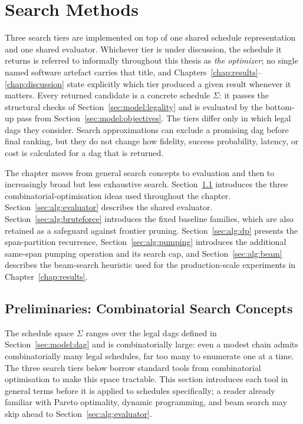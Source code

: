 \chapter{Search Methods}
\label{chap:algorithms}


Three search tiers are implemented on top of one shared schedule representation and one shared evaluator. Whichever tier is under discussion, the schedule it returns is referred to informally throughout this thesis as \emph{the optimizer}; no single named software artefact carries that title, and Chapters~\ref{chap:results}--\ref{chap:discussion} state explicitly which tier produced a given result whenever it matters. Every returned candidate is a concrete schedule $\Sigma$: it passes the structural checks of Section~\ref{sec:model:legality} and is evaluated by the bottom-up pass from Section~\ref{sec:model:objectives}. The tiers differ only in which legal \Glspl{dag} they consider. Search approximations can exclude a promising \Gls{dag} before final ranking, but they do not change how fidelity, success probability, latency, or cost is calculated for a \Gls{dag} that is returned.

The chapter moves from general search concepts to evaluation and then to increasingly broad but less exhaustive search. Section~\ref{sec:alg:prelims} introduces the three combinatorial-optimisation ideas used throughout the chapter. Section~\ref{sec:alg:evaluator} describes the shared evaluator. Section~\ref{sec:alg:bruteforce} introduces the fixed baseline families, which are also retained as a safeguard against frontier pruning. Section~\ref{sec:alg:dp} presents the span-partition recurrence, Section~\ref{sec:alg:pumping} introduces the additional same-span pumping operation and its search cap, and Section~\ref{sec:alg:beam} describes the beam-search heuristic used for the production-scale experiments in Chapter~\ref{chap:results}.

\section{Preliminaries: Combinatorial Search Concepts}
\label{sec:alg:prelims}

The schedule space $\Sigma$ ranges over the legal \Glspl{dag} defined in Section~\ref{sec:model:dag} and is combinatorially large: even a modest chain admits combinatorially many legal schedules, far too many to enumerate one at a time. The three search tiers below borrow standard tools from combinatorial optimisation to make this space tractable. This section introduces each tool in general terms before it is applied to schedules specifically; a reader already familiar with Pareto optimality, dynamic programming, and beam search may skip ahead to Section~\ref{sec:alg:evaluator}.

